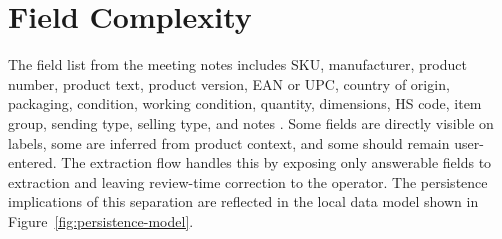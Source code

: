 \section{Field Complexity}

The field list from the meeting notes includes SKU, manufacturer, product number, product text, product version, EAN or UPC, country of origin, packaging, condition, working condition, quantity, dimensions, HS code, item group, sending type, selling type, and notes \cite{meeting-notes}. Some fields are directly visible on labels, some are inferred from product context, and some should remain user-entered. The extraction flow handles this by exposing only answerable fields to extraction and leaving review-time correction to the operator. The persistence implications of this separation are reflected in the local data model shown in Figure~\ref{fig:persistence-model}.
